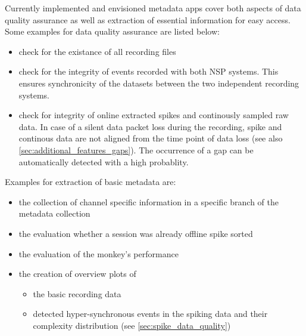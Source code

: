 Currently implemented and envisioned metadata apps cover both aspects of data quality assurance as well as extraction of essential information for easy access. Some examples for data quality assurance are listed below:
\begin{itemize}
 \item check for the existance of all recording files
 \item check for the integrity of events recorded with both NSP systems. This ensures synchronicity of the datasets between the two independent  recording systems.
 \item check for integrity of online extracted spikes and continously sampled raw data. In case of a silent data packet loss during the recording, spike and continous data are not aligned from the time point of data loss (see also \cref{sec:additional_features_gaps}). The occurrence of a gap can be automatically detected with a high probablity.
\end{itemize}

Examples for extraction of basic metadata are:
\begin{itemize}
  \setlength{\itemsep}{0pt}
  \setlength{\parskip}{0pt}
  \setlength{\parsep}{0pt}
 \item the collection of channel specific information in a specific branch of the metadata collection
 \item the evaluation whether a session was already offline spike sorted
 \item the evaluation of the monkey's performance
 \item the creation of overview plots of 
 \begin{itemize}
  \setlength\itemsep{0pt}
  \setlength{\parskip}{0pt}
  \setlength{\parsep}{0pt}
  \item the basic recording data
  \item detected hyper-synchronous events in the spiking data and their complexity distribution (see \cref{sec:spike_data_quality})
 \end{itemize}
\end{itemize}

